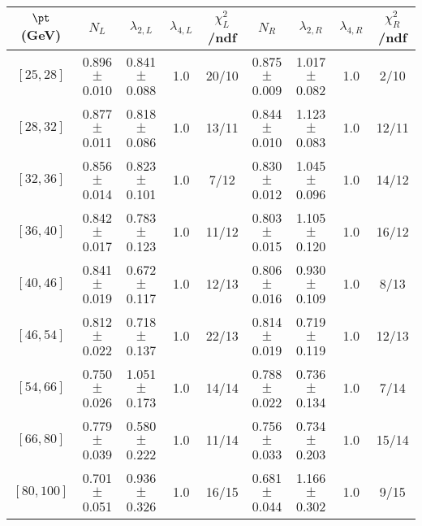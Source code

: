 \begin{tabular}{c||c|c|c|c||c|c|c|c}
$\pt$ (GeV) & $N_L$ & $\lambda_{2,L}$ & $\lambda_{4,L}$  & $\chi^2_L$/ndf & $N_R$ & $\lambda_{2,R}$ & $\lambda_{4,R}$  & $\chi^2_R$/ndf \\
\hline
$[25, 28]$ & 0.896$\pm$0.010 & 0.841$\pm$0.088 & 1.0 & 20/10 & 0.875$\pm$0.009 & 1.017$\pm$0.082 & 1.0 & 2/10\\
$[28, 32]$ & 0.877$\pm$0.011 & 0.818$\pm$0.086 & 1.0 & 13/11 & 0.844$\pm$0.010 & 1.123$\pm$0.083 & 1.0 & 12/11\\
$[32, 36]$ & 0.856$\pm$0.014 & 0.823$\pm$0.101 & 1.0 & 7/12 & 0.830$\pm$0.012 & 1.045$\pm$0.096 & 1.0 & 14/12\\
$[36, 40]$ & 0.842$\pm$0.017 & 0.783$\pm$0.123 & 1.0 & 11/12 & 0.803$\pm$0.015 & 1.105$\pm$0.120 & 1.0 & 16/12\\
$[40, 46]$ & 0.841$\pm$0.019 & 0.672$\pm$0.117 & 1.0 & 12/13 & 0.806$\pm$0.016 & 0.930$\pm$0.109 & 1.0 & 8/13\\
$[46, 54]$ & 0.812$\pm$0.022 & 0.718$\pm$0.137 & 1.0 & 22/13 & 0.814$\pm$0.019 & 0.719$\pm$0.119 & 1.0 & 12/13\\
$[54, 66]$ & 0.750$\pm$0.026 & 1.051$\pm$0.173 & 1.0 & 14/14 & 0.788$\pm$0.022 & 0.736$\pm$0.134 & 1.0 & 7/14\\
$[66, 80]$ & 0.779$\pm$0.039 & 0.580$\pm$0.222 & 1.0 & 11/14 & 0.756$\pm$0.033 & 0.734$\pm$0.203 & 1.0 & 15/14\\
$[80, 100]$ & 0.701$\pm$0.051 & 0.936$\pm$0.326 & 1.0 & 16/15 & 0.681$\pm$0.044 & 1.166$\pm$0.302 & 1.0 & 9/15\\
\end{tabular}
